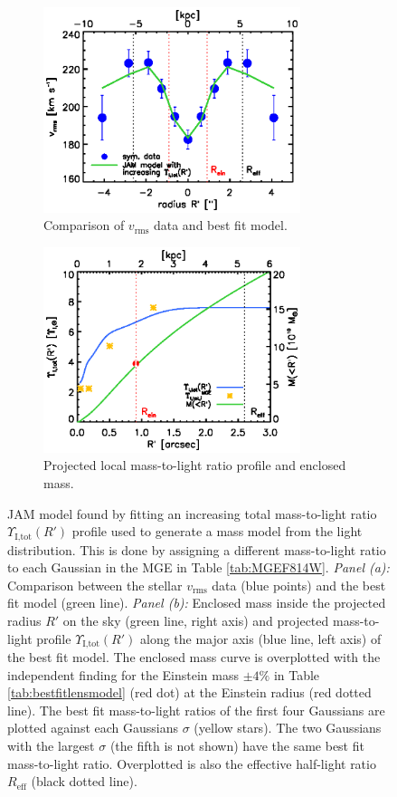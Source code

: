 
\begin{figure}
\centering
\begin{subfigure}{.5\textwidth}
  \centering
  \includegraphics[height=6cm]{fig/jam_G_vrms.ps}
  \caption{Comparison of $v_\text{rms}$ data and best fit model.}
  \label{fig:JAM_modelG}
\end{subfigure}%
\begin{subfigure}{.5\textwidth}
  \centering
  \includegraphics[height=6cm]{fig/jam_G_enclMass.ps}
  \caption{Projected local mass-to-light ratio profile and enclosed mass.}
  \label{fig:enclMass_modelG}
\end{subfigure}
\caption{JAM model found by fitting an increasing total mass-to-light ratio $\Upsilon_\text{I,tot}(R')$ profile used to generate a mass model from the light distribution.  This is done by assigning a different mass-to-light ratio to each Gaussian in the MGE in Table \ref{tab:MGEF814W}. \emph{Panel (a):} Comparison between the stellar $v_\text{rms}$ data (blue points) and the best fit model (green line). \emph{Panel (b):} Enclosed mass inside the projected radius $R'$ on the sky (green line, right axis) and projected mass-to-light profile $\Upsilon_\text{I,tot}(R')$ along the major axis (blue line, left axis) of the best fit model. The enclosed mass curve is overplotted with the independent finding for the Einstein mass $\pm 4 \%$ in Table \ref{tab:bestfitlensmodel} (red dot) at the Einstein radius (red dotted line). The best fit mass-to-light ratios of the first four Gaussians are plotted against each Gaussians $\sigma$ (yellow stars). The two Gaussians with the largest $\sigma$ (the fifth is not shown) have the same best fit mass-to-light ratio. Overplotted is also the effective half-light ratio $R_\text{eff}$ (black dotted line). }
\label{fig:modelG}
\end{figure}

